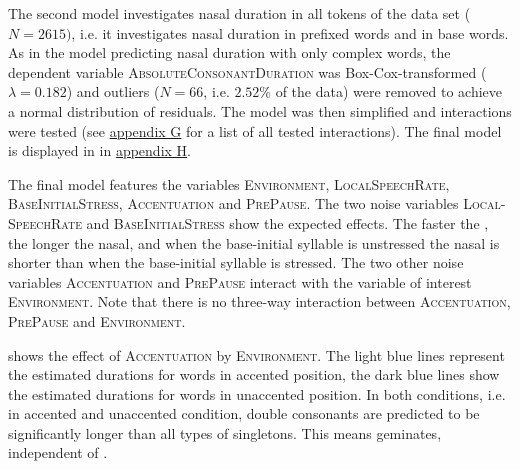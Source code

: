 The second model investigates nasal duration in all tokens of the data set ($N=2615)$, i.e. it investigates nasal duration in prefixed words and in base words. 
As in the model predicting nasal duration with only complex words, the dependent variable \textsc{AbsoluteConsonantDuration} was Box-Cox-transformed ($\lambda= 0.182$) and outliers ($N=66$, i.e. $ 2.52$\% of the data) were removed to achieve a normal distribution of residuals. The model was then simplified and interactions were tested (see \hyperref[Appendix G Summaries of tested interactions in experimental study]{appendix G} for a list of all tested interactions). The final model is displayed in  in \hyperref[Appendix H: Model Summaries Experiment]{appendix H}.


The final model features the variables \textsc{Environment}, \textsc{LocalSpeechRate}, \textsc{BaseInitialStress}, \textsc{Accentuation} and \textsc{PrePause}.
The two noise variables \textsc{Local-SpeechRate} and \textsc{BaseInitialStress} show the expected effects. The faster the , the longer the nasal, and when the base-initial syllable is unstressed the nasal is shorter than when the base-initial syllable is stressed.
The two other noise variables \textsc{Accentuation} and \textsc{PrePause} interact with the variable of interest \textsc{Environment}. Note that there is no three-way interaction between  \textsc{Accentuation}, \textsc{PrePause} and \textsc{Environment}.

 shows the effect of \textsc{Accentuation} by \textsc{Environment}. The light blue lines represent the estimated durations for words  in accented position, the dark blue lines show the estimated durations for words in unaccented position. In both conditions, i.e. in accented and unaccented condition, double consonants are predicted to be significantly longer than all types of singletons. This means  geminates, independent of .

